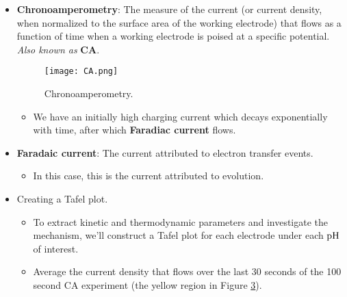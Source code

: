 \documentclass[../notes.tex]{subfiles}
\begin{document}
\begin{itemize}
\begin{figure}[h!]
\begin{subfigure}[b]{0.45\linewidth}
            \centering
            \texttt{[image: CVb.png]}
            \caption{Cyclic voltammagram.}
            \label{fig:CVb}
        \end{subfigure}
        \caption{Cyclic voltammetry.}
        \label{fig:CV}
    \end{figure}
    \begin{itemize}
        \item Figure \ref{fig:CVa} shows the potentials we sweep over, first negative and then positive, as time progresses. Notice that this change in potential is mirrored by the grey arrows in Figure \ref{fig:CVb}.
        \item Figure \ref{fig:CVb} shows the cyclic voltammagram. The black points lie along the foot of the wave and are where we want to collect CA data. They correspond to overpotentials that induce catalysis.
    \end{itemize}
    \item \textbf{Chronoamperometry}: The measure of the current (or current density, when normalized to the surface area of the working electrode) that flows as a function of time when a working electrode is poised at a specific potential. \emph{Also known as} \textbf{CA}.
    \begin{figure}[h!]
        \centering
        \texttt{[image: CA.png]}
        \caption{Chronoamperometry.}
        \label{fig:CA}
    \end{figure}
    \begin{itemize}
        \item We have an initially high charging current which decays exponentially with time, after which \textbf{Faradiac current} flows.
    \end{itemize}
    \item \textbf{Faradaic current}: The current attributed to electron transfer events.
    \begin{itemize}
        \item In this case, this is the current attributed to  evolution.
    \end{itemize}
    \item Creating a Tafel plot.
    \begin{itemize}
        \item To extract kinetic and thermodynamic parameters and investigate the mechanism, we'll construct a Tafel plot for each electrode under each $\operatorname{pH}$ of interest.
        \item Average the current density that flows over the last 30 seconds of the 100 second CA experiment (the yellow region in Figure \ref{fig:CA}).

\end{itemize}
\end{itemize}
\end{document}
